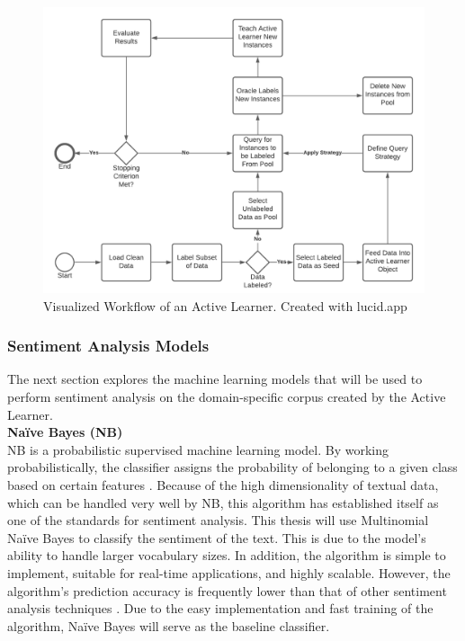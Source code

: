 \documentclass[11pt, a4paper]{article}
\begin{document}
\begin{figure}
    \centering
    \includegraphics[width=\textwidth]{al_workflow.png}
    \caption{Visualized Workflow of an Active Learner. Created with lucid.app}
    \label{fig:AL_Workflow}
\end{figure}

\subsubsection{Sentiment Analysis Models}
The next section explores the machine learning models that will be used to perform sentiment analysis on the domain-specific corpus created by the Active Learner. \\

\noindent\textbf{Naïve Bayes (NB)}\\
NB is a probabilistic supervised machine learning model. By working probabilistically, the classifier assigns the probability of 
belonging to a given class based on certain features \citep{jemai2021SentimentAnalysis}. Because of the high dimensionality of textual data, 
which can be handled very well by NB, this algorithm has established itself as one of the standards for sentiment analysis. 
This thesis will use Multinomial Naïve Bayes to classify the sentiment of the text. This is due to the model’s ability to handle 
larger vocabulary sizes. In addition, the algorithm is simple to implement, suitable for real-time applications, and highly scalable. 
However, the algorithm's prediction accuracy is frequently lower than that of other sentiment analysis techniques \citep{song2017novelclassification}. 
Due to the easy implementation and fast training of the algorithm, Naïve Bayes will serve as the baseline classifier.\\
\end{document}
